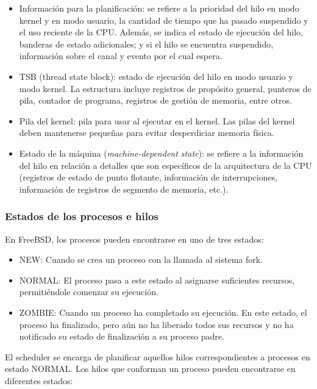 \begin{itemize}
    \item Información para la planificación: se refiere a la prioridad del hilo en modo kernel y en modo usuario, la cantidad de tiempo que ha pasado suspendido y el uso reciente de la CPU. Además, se indica el estado de ejecución del hilo, banderas de estado adicionales; y si el hilo se encuentra suspendido, información sobre el canal y evento por el cual espera.
    \item TSB (thread state block): estado de ejecución del hilo en modo usuario y modo kernel. La estructura incluye registros de propósito general, punteros de pila, contador de programa, registros de gestión de memoria, entre otros.
    \item Pila del kernel: pila para usar al ejecutar en el kernel. Las pilas del kernel deben mantenerse pequeñas para evitar desperdiciar memoria física.
    \item Estado de la máquina (\textit{machine-dependent state}): se refiere a la información del hilo en relación a detalles que son específicos de la arquitectura de la CPU (registros de estado de punto flotante, información de interrupciones, información de registros de segmento de memoria, etc.).
\end{itemize}

\subsubsection{Estados de los procesos e hilos}

En FreeBSD, los procesos pueden encontrarse en uno de tres estados:

\begin{itemize}
    \item \uppercase{New}: Cuando se crea un proceso con la llamada al sistema fork.
    \item \uppercase{Normal}: El proceso pasa a este estado al asignarse suficientes recursos, permitiéndole comenzar su ejecución.
    \item \uppercase{Zombie}: Cuando un proceso ha completado su ejecución. En este estado, el proceso ha finalizado, pero aún no ha liberado todos sus recursos y no ha notificado su estado de finalización a su proceso padre.
\end{itemize}

El scheduler se encarga de planificar aquellos hilos correspondientes a procesos en estado NORMAL. Los hilos que conforman un proceso pueden encontrarse en diferentes estados:

